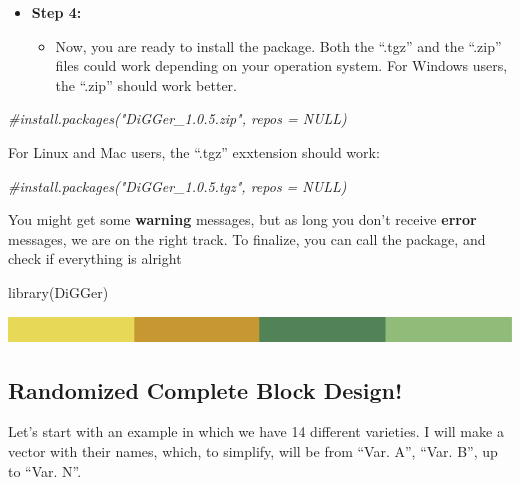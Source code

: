 \documentclass[
]{book}
\newenvironment{Shaded}{\begin{snugshade}}{\end{snugshade}}
\newcommand{\CommentTok}[1]{\textcolor[rgb]{0.56,0.35,0.01}{\textit{#1}}}
\newcommand{\FunctionTok}[1]{\textcolor[rgb]{0.00,0.00,0.00}{#1}}
\newcommand{\NormalTok}[1]{#1}
\providecommand{\tightlist}{%
  \setlength{\itemsep}{0pt}\setlength{\parskip}{0pt}}
\begin{document}
\begin{itemize}
\item
  \textbf{Step 4:}

  \begin{itemize}
  \tightlist
  \item
    Now, you are ready to install the package. Both the ``.tgz'' and the ``.zip'' files could work depending on your operation system. For Windows users, the ``.zip'' should work better.
  \end{itemize}
\end{itemize}

\begin{Shaded}
\begin{Highlighting}[]
\CommentTok{\#install.packages("DiGGer\_1.0.5.zip", repos = NULL)}
\end{Highlighting}
\end{Shaded}

For Linux and Mac users, the ``.tgz'' exxtension should work:

\begin{Shaded}
\begin{Highlighting}[]
\CommentTok{\#install.packages("DiGGer\_1.0.5.tgz", repos = NULL)}
\end{Highlighting}
\end{Shaded}

You might get some \textbf{warning} messages, but as long you don't receive \textbf{error} messages, we are on the right track. To finalize, you can call the package, and check if everything is alright

\begin{Shaded}
\begin{Highlighting}[]
\FunctionTok{library}\NormalTok{(DiGGer)}
\end{Highlighting}
\end{Shaded}

\includegraphics{rsrstrip.png}

\hypertarget{randomized-complete-block-design}{%
\subsection{Randomized Complete Block Design!}\label{randomized-complete-block-design}}

Let's start with an example in which we have 14 different varieties. I will make a vector with their names, which, to simplify, will be from ``Var. A'', ``Var. B'', up to ``Var. N''.
\end{document}
